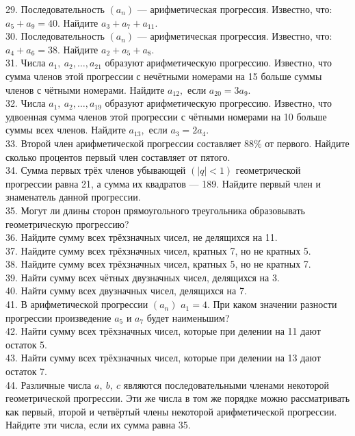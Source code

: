 29. Последовательность $(a_n)$ --- арифметическая прогрессия. Известно, что: $a_5+a_9=40.$ Найдите $a_3+a_7+a_{11}.$\\
30. Последовательность $(a_n)$ --- арифметическая прогрессия. Известно, что: $a_4+a_6=38.$ Найдите $a_2+a_5+a_{8}.$\\
31. Числа $a_1,\ a_2,\ldots,a_{21}$ образуют арифметическую прогрессию. Известно, что сумма членов этой прогрессии с нечётными номерами на 15 больше суммы членов с чётными номерами. Найдите $a_{12},$ если $a_{20}=3a_9.$\\
32. Числа $a_1,\ a_2,\ldots,a_{19}$ образуют арифметическую прогрессию. Известно, что удвоенная сумма членов этой прогрессии с чётными номерами на 10 больше суммы всех членов. Найдите $a_{13},$ если $a_{3}=2a_4.$\\
33. Второй член арифметической прогрессии составляет $88\%$ от первого. Найдите сколько процентов первый член составляет от пятого.\\
34. Сумма первых трёх членов убывающей $(|q|<1)$ геометрической прогрессии равна 21, а сумма их квадратов --- 189. Найдите первый член и знаменатель данной прогрессии.\\
35. Могут ли длины сторон прямоугольного треугольника образовывать геометрическую прогрессию?\\
36. Найдите сумму всех трёхзначных чисел, не делящихся на 11.\\
37. Найдите сумму всех трёхзначных чисел, кратных 7, но не кратных 5.\\
38. Найдите сумму всех трёхзначных чисел, кратных 5, но не кратных 7.\\
39. Найти сумму всех чётных двузначных чисел, делящихся на 3.\\
40. Найти сумму всех двузначных чисел, делящихся на 7.\\
41. В арифметической прогрессии $(a_n)$ $a_1=4.$ При каком значении разности прогрессии произведение $a_5$ и $a_7$ будет наименьшим?\\
42. Найти сумму всех трёхзначных чисел, которые при делении на 11 дают остаток 5.\\
43. Найти сумму всех трёхзначных чисел, которые при делении на 13 дают остаток 7.\\
44. Различные числа $a,\ b,\ c$ являются последовательными членами некоторой геометрической прогрессии. Эти же числа в том же порядке можно рассматривать как первый, второй и четвёртый члены некоторой арифметической прогрессии. Найдите эти числа, если их сумма равна 35.\\
